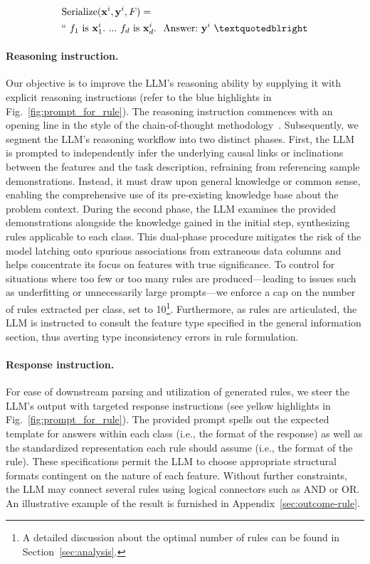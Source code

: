 \begin{align}
&\text{Serialize}(\mathbf{x}^i,\mathbf{y}^i, F) = \nonumber \\ 
&``\ f_1\ \text{is}\ \mathbf{x}^i_1.\ ... \ f_d\  \text{is}\  \mathbf{x}^i_d.\ \ \text{Answer:}\  \mathbf{y}^i\ ”
\end{align}

\vspace*{-0.12in}
\paragraph{Reasoning instruction.} Our objective is to improve the LLM's reasoning ability by supplying it with explicit reasoning instructions (refer to the blue highlights in Fig.~\ref{fig:prompt_for_rule}). The reasoning instruction commences with an opening line in the style of the chain-of-thought methodology~\cite{wei2022chain}. Subsequently, we segment the LLM's reasoning workflow into two distinct phases. First, the LLM is prompted to independently infer the underlying causal links or inclinations between the features and the task description, refraining from referencing sample demonstrations. Instead, it must draw upon general knowledge or common sense, enabling the comprehensive use of its pre-existing knowledge base about the problem context. During the second phase, the LLM examines the provided demonstrations alongside the knowledge gained in the initial step, synthesizing rules applicable to each class. This dual-phase procedure mitigates the risk of the model latching onto spurious associations from extraneous data columns and helps concentrate its focus on features with true significance. To control for situations where too few or too many rules are produced—leading to issues such as underfitting or unnecessarily large prompts—we enforce a cap on the number of rules extracted per class, set to 10\footnote{A detailed discussion about the optimal number of rules can be found in Section~\ref{sec:analysis}.}. Furthermore, as rules are articulated, the LLM is instructed to consult the feature type specified in the general information section, thus averting type inconsistency errors in rule formulation.

\vspace*{-0.12in}
\paragraph{Response instruction.} For ease of downstream parsing and utilization of generated rules, we steer the LLM’s output with targeted response instructions (see yellow highlights in Fig.~\ref{fig:prompt_for_rule}). The provided prompt spells out the expected template for answers within each class (i.e., the format of the response) as well as the standardized representation each rule should assume (i.e., the format of the rule). These specifications permit the LLM to choose appropriate structural formats contingent on the nature of each feature. Without further constraints, the LLM may connect several rules using logical connectors such as AND or OR. An illustrative example of the result is furnished in Appendix~\ref{sec:outcome-rule}.

